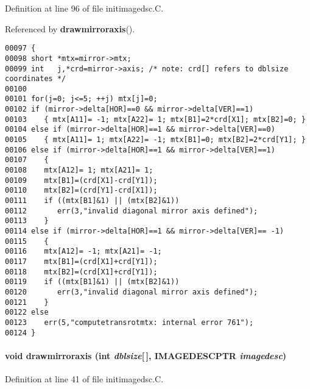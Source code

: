 Definition at line 96 of file initimagedsc.C.

Referenced by {\bf drawmirroraxis}().\small\begin{verbatim}00097 {
00098 short *mtx=mirror->mtx;
00099 int   j,*crd=mirror->axis; /* note: crd[] refers to dblsize coordinates */
00100 
00101 for(j=0; j<=5; ++j) mtx[j]=0;
00102 if (mirror->delta[HOR]==0 && mirror->delta[VER]==1)
00103    { mtx[A11]= -1; mtx[A22]= 1; mtx[B1]=2*crd[X1]; mtx[B2]=0; }
00104 else if (mirror->delta[HOR]==1 && mirror->delta[VER]==0)
00105    { mtx[A11]= 1; mtx[A22]= -1; mtx[B1]=0; mtx[B2]=2*crd[Y1]; }
00106 else if (mirror->delta[HOR]==1 && mirror->delta[VER]==1)
00107    {
00108    mtx[A12]= 1; mtx[A21]= 1;
00109    mtx[B1]=(crd[X1]-crd[Y1]);
00110    mtx[B2]=(crd[Y1]-crd[X1]);
00111    if ((mtx[B1]&1) || (mtx[B2]&1))
00112       err(3,"invalid diagonal mirror axis defined");
00113    }
00114 else if (mirror->delta[HOR]==1 && mirror->delta[VER]== -1)
00115    {
00116    mtx[A12]= -1; mtx[A21]= -1;
00117    mtx[B1]=(crd[X1]+crd[Y1]);
00118    mtx[B2]=(crd[X1]+crd[Y1]);
00119    if ((mtx[B1]&1) || (mtx[B2]&1))
00120       err(3,"invalid diagonal mirror axis defined");
00121    }
00122 else
00123    err(5,"computetransrotmtx: internal error 761");
00124 }
\end{verbatim}\normalsize 
\label{initimagedsc.C_a1}
\paragraph{\setlength{\rightskip}{0pt plus 5cm}void drawmirroraxis (int {\em dblsize}[$\,$], {\bf IMAGEDESCPTR} {\em imagedesc})}\hfill



Definition at line 41 of file initimagedsc.C.

